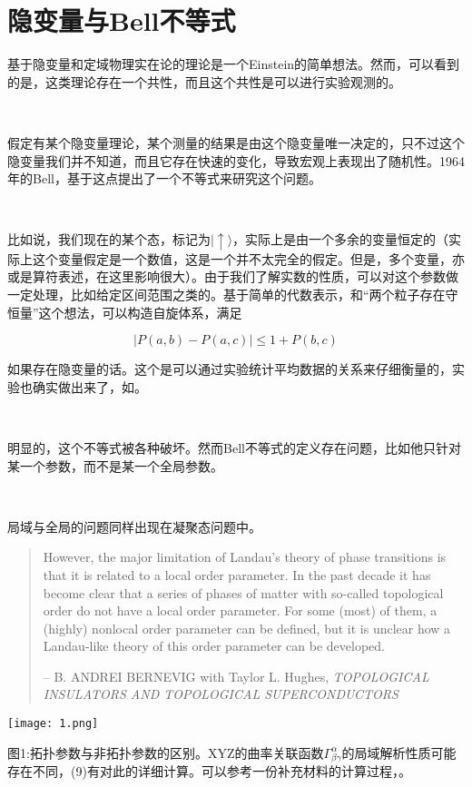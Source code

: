 \documentclass[aps,showpacs,twocolumn]{revtex4}%
\begin{document}
\section{隐变量与Bell不等式}

基于隐变量和定域物理实在论的理论是一个Einstein的简单想法。然而，可以看到的是，这类理论存在一个共性，而且这个共性是可以进行实验观测的。

\ 

假定有某个隐变量理论，某个测量的结果是由这个隐变量唯一决定的，只不过这个隐变量我们并不知道，而且它存在快速的变化，导致宏观上表现出了随机性。1964年的Bell，基于这点提出了一个不等式来研究这个问题。

\ 

比如说，我们现在的某个态，标记为$|\uparrow\rangle$，实际上是由一个多余的变量恒定的（实际上这个变量假定是一个数值，这是一个并不太完全的假定。但是，多个变量，亦或是算符表述，在这里影响很大）。由于我们了解实数的性质，可以对这个参数做一定处理，比如给定区间范围之类的。基于简单的代数表示，和“两个粒子存在守恒量”这个想法，可以构造自旋体系，满足

\[|P(a,b)-P(a,c)|\le 1+P(b,c) \]

如果存在隐变量的话。这个是可以通过实验统计平均数据的关系来仔细衡量的，实验也确实做出来了，如\cite{PhysRevLett.49.91}。

\ 

明显的，这个不等式被各种破坏。然而Bell不等式的定义存在问题，比如他只针对某一个参数，而不是某一个全局参数。

\ 

局域与全局的问题同样出现在凝聚态问题中。

\begin{quote}
However, the major limitation of Landau’s theory of phase transitions is that it is related to a local order parameter. In the past decade it has become clear that a series of phases of matter with so-called topological order do not have a local order parameter. For some (most) of them, a (highly) nonlocal order parameter can be defined, but it is unclear how a Landau-like theory of this order parameter can be developed. 

\quad -- B. ANDREI BERNEVIG with Taylor L. Hughes, \emph{TOPOLOGICAL INSULATORS AND TOPOLOGICAL SUPERCONDUCTORS}\cite{bernevig2013topological}
\end{quote}

\begin{widetext}
\begin{center}
\texttt{[image: 1.png]}

图1:拓扑参数与非拓扑参数的区别。XYZ的曲率关联函数$\Gamma^{\alpha}_{\beta\gamma}$的局域解析性质可能存在不同，\cite{PhysRevE.86.046106}(9)有对此的详细计算。可以参考一份补充材料的计算过程，\cite{YY11,YY12,YY13}。
\end{center}
\end{widetext}
\end{document}
